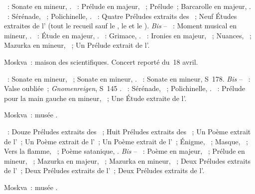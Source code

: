 \begin{description}
 \textsc{\Glazounov{}}~: Sonate en \kB \Flat mineur, .
 \textsc{\Liadov{}}~: Prélude en \kD \Flat majeur,  ~;
 Prélude~; Barcarolle en \kF \Sharp majeur, .
 \textsc{\Rachmaninov{}}~: Sérénade,  ~; Polichinelle,
  .
 \textsc{\Scriabine{}}~: Quatre Préludes extraits des ~;
 Neuf Études extraites de l' (tout le recueil sauf le , le
  et le ).
 \emph{Bis} -- \textsc{\Rachmaninov{}}~: Moment musical en \kE \Flat mineur,
  .
 \textsc{\Scriabine{}}~: Étude en \kD \Flat majeur,  .
 \textsc{\Liadov{}}~: Grimace,  .
 \textsc{\Scriabine{}}~: Ironies en \kC majeur,  ~;
 Nuances,  ~; Mazurka en \kE mineur, 
 ~; Un Prélude extrait de l'.
 \item[\DateWithWeekDay{1948-05-23}]
 Moskva~: maison des scientifiques.
 Concert reporté du~18 avril.

 \textsc{\Beethoven{}}~: Sonate en \kC \Sharp mineur,  ~;
 Sonate en \kF mineur, .
 \textsc{\Liszt{}}~: Sonate en \kB mineur, S~178.
 \emph{Bis} -- \textsc{\Liszt{}}~: Valse oubliée~; \emph{Gnomenreigen},
 S~145 .
 \textsc{\Rachmaninov{}}~: Sérénade,  ~; Polichinelle,
  .
 \textsc{\Scriabine{}}~: Prélude pour la main gauche en \kC \Sharp mineur,
  ~; Une Étude extraite de l'.
 \item[\DateWithWeekDay{1948-05-28}]
 Moskva~: musée \Scriabine{}.

 \textsc{\Scriabine{}}~: Douze Préludes extraits des ~; Huit Préludes extraits des ~; Un Poème
 extrait de l'~; Un Poème extrait de l'~; Un Poème extrait
 de l'~; Énigme,  ~; Masque, 
 ~; Vers la flamme, ~; Poème satanique, .
 \emph{Bis} -- \textsc{\Scriabine{}}~: Poème en \kF \Sharp majeur, 
 ~; Prélude en \kC \Sharp mineur,  ~; Mazurka
 en \kF \Sharp majeur,  ~; Mazurka en \kE mineur,
  ~; Deux Préludes extraits de l'~; Deux
 Préludes extraits de l'~; Deux Préludes extraits de l'.
 \item[\DateWithWeekDay{1948-06-15}]
 Moskva~: musée \Scriabine{}.


\end{description}
